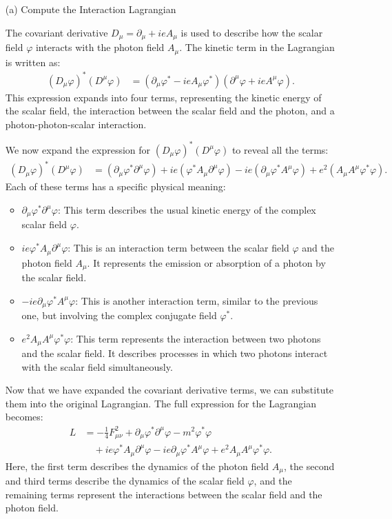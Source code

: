 \begin{enumerate}
    \item [(a)] Compute the Interaction Lagrangian

The covariant derivative $D_\mu = \partial_\mu + ie A_\mu$ is used to describe how the scalar field $\varphi$ interacts with the photon field $A_\mu$. The kinetic term in the Lagrangian is written as:
\begin{align}
    (D_\mu \varphi)^* (D^\mu \varphi) &= \left( \partial_\mu \varphi^* - ie A_\mu \varphi^* \right) \left( \partial^\mu \varphi + ie A^\mu \varphi \right).
\end{align}
This expression expands into four terms, representing the kinetic energy of the scalar field, the interaction between the scalar field and the photon, and a photon-photon-scalar interaction.

We now expand the expression for $(D_\mu \varphi)^* (D^\mu \varphi)$ to reveal all the terms:
\begin{align}
    (D_\mu \varphi)^* (D^\mu \varphi) &= \left( \partial_\mu \varphi^* \partial^\mu \varphi \right) 
    + ie \left( \varphi^* A_\mu \partial^\mu \varphi \right)
    - ie \left( \partial_\mu \varphi^* A^\mu \varphi \right)
    + e^2 \left( A_\mu A^\mu \varphi^* \varphi \right).
\end{align}
Each of these terms has a specific physical meaning:
\begin{itemize}
    \item $\partial_\mu \varphi^* \partial^\mu \varphi$: This term describes the usual kinetic energy of the complex scalar field $\varphi$.
    \item $ie \varphi^* A_\mu \partial^\mu \varphi$: This is an interaction term between the scalar field $\varphi$ and the photon field $A_\mu$. It represents the emission or absorption of a photon by the scalar field.
    \item $-ie \partial_\mu \varphi^* A^\mu \varphi$: This is another interaction term, similar to the previous one, but involving the complex conjugate field $\varphi^*$.
    \item $e^2 A_\mu A^\mu \varphi^* \varphi$: This term represents the interaction between two photons and the scalar field. It describes processes in which two photons interact with the scalar field simultaneously.
\end{itemize}

Now that we have expanded the covariant derivative terms, we can substitute them into the original Lagrangian. The full expression for the Lagrangian becomes:
\begin{align}
    L &= -\frac{1}{4} F_{\mu\nu}^2 + \partial_\mu \varphi^* \partial^\mu \varphi - m^2 \varphi^* \varphi \nonumber \\
    &\quad + ie \varphi^* A_\mu \partial^\mu \varphi - ie \partial_\mu \varphi^* A^\mu \varphi + e^2 A_\mu A^\mu \varphi^* \varphi.
\end{align}
Here, the first term describes the dynamics of the photon field $A_\mu$, the second and third terms describe the dynamics of the scalar field $\varphi$, and the remaining terms represent the interactions between the scalar field and the photon field.


\end{enumerate}
